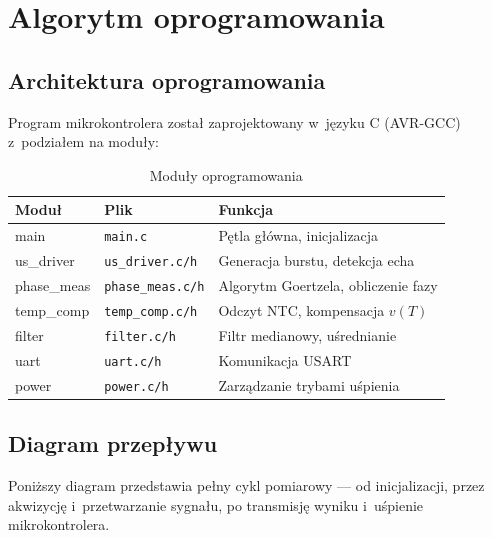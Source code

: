 \documentclass[a4paper,11pt]{article}
\begin{document}
	
	\clearpage
	\section{Algorytm oprogramowania}
	\label{sec:algorytm}
	
	\subsection{Architektura oprogramowania}
	
	Program mikrokontrolera został zaprojektowany w~języku C (AVR-GCC) z~podziałem
	na moduły:
	
	\begin{table}[H]
		\centering
		\caption{Moduły oprogramowania}
		\label{tab:moduly_sw}
		\begin{tabular}{lll}
			\toprule
			\textbf{Moduł} & \textbf{Plik} & \textbf{Funkcja} \\
			\midrule
			main & \texttt{main.c} & Pętla główna, inicjalizacja \\
			us\_driver & \texttt{us\_driver.c/h} & Generacja burstu, detekcja echa \\
			phase\_meas & \texttt{phase\_meas.c/h} & Algorytm Goertzela, obliczenie fazy \\
			temp\_comp & \texttt{temp\_comp.c/h} & Odczyt NTC, kompensacja $v(T)$ \\
			filter & \texttt{filter.c/h} & Filtr medianowy, uśrednianie \\
			uart & \texttt{uart.c/h} & Komunikacja USART \\
			power & \texttt{power.c/h} & Zarządzanie trybami uśpienia \\
			\bottomrule
		\end{tabular}
	\end{table}
	
	\subsection{Diagram przepływu}
	
	\noindent Poniższy diagram przedstawia pełny cykl pomiarowy --- od inicjalizacji,
	przez akwizycję i~przetwarzanie sygnału, po transmisję wyniku i~uśpienie mikrokontrolera.
	
\end{document}
